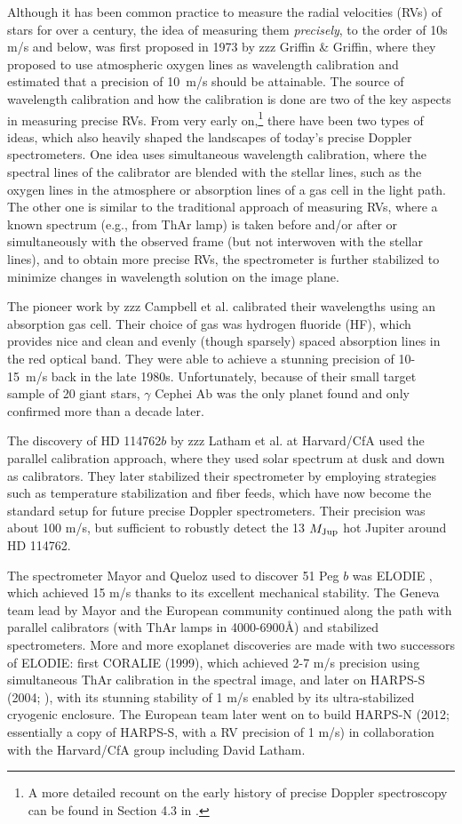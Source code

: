 Although it has been common practice to measure the radial velocities
(RVs) of stars for over a century, the idea of measuring them {\it
precisely}, to the order of 10s m/s and below, was first proposed in
1973 by zzz Griffin \& Griffin, where they proposed to use atmospheric
oxygen lines as wavelength calibration and estimated that a precision
of 10~m/s should be attainable. The source of wavelength calibration
and how the calibration is done are two of the key aspects in
measuring precise RVs. From very early on,\footnote{A more detailed
recount on the early history of precise Doppler spectroscopy can be
found in Section 4.3 in \cite{2013pss3.book..489W}.} there have been
two types of ideas, which also heavily shaped the landscapes of
today's precise Doppler spectrometers. One idea uses simultaneous
wavelength calibration, where the spectral lines of the calibrator are
blended with the stellar lines, such as the oxygen lines in the
atmosphere or absorption lines of a gas cell in the light path. The
other one is similar to the traditional approach of measuring RVs,
where a known spectrum (e.g., from ThAr lamp) is taken before and/or
after or simultaneously with the observed frame (but not interwoven
with the stellar lines), and to obtain more precise RVs, the
spectrometer is further stabilized to minimize changes in wavelength
solution on the image plane.

The pioneer work by zzz Campbell et al. calibrated their wavelengths
using an absorption gas cell. Their choice of gas was hydrogen
fluoride (HF), which provides nice and clean and evenly (though
sparsely) spaced absorption lines in the red optical band. They were
able to achieve a stunning precision of 10-15~m/s back in the late
1980s. Unfortunately, because of their small target sample of 20 giant
stars, $\gamma$ Cephei Ab was the only planet found and only confirmed
more than a decade later.

The discovery of HD 114762$b$ by zzz Latham et al. at Harvard/CfA used
the parallel calibration approach, where they used solar spectrum at
dusk and down as calibrators. They later stabilized their spectrometer
by employing strategies such as temperature stabilization and fiber
feeds, which have now become the standard setup for future precise
Doppler spectrometers. Their precision was about 100 m/s, but
sufficient to robustly detect the 13 $M_{\rm Jup}$ hot Jupiter around HD
114762.

The spectrometer Mayor and Queloz used to discover 51 Peg $b$ was
ELODIE \citep{elodie}, which achieved 15 m/s thanks to its excellent
mechanical stability. The Geneva team lead by Mayor and the European
community continued along the path with parallel calibrators (with
ThAr lamps in 4000-6900\AA) and stabilized spectrometers. More and
more exoplanet discoveries are made with two successors of ELODIE:
first CORALIE (1999), which achieved 2-7 m/s precision using
simultaneous ThAr calibration in the spectral image, and later on
HARPS-S (2004; \citealt{harps-s}), with its stunning stability of 1
m/s enabled by its ultra-stabilized cryogenic enclosure. The European
team later went on to build HARPS-N (2012; essentially a copy of
HARPS-S, with a RV precision of 1 m/s) in collaboration with the
Harvard/CfA group including David Latham.

